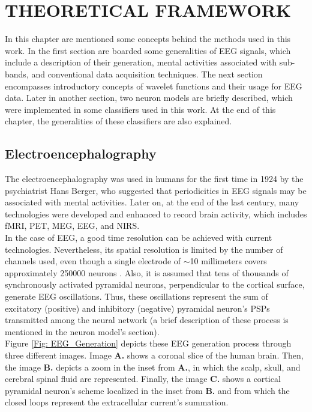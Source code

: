 \chapter[THEORETICAL FRAMEWORK]{\huge THEORETICAL FRAMEWORK}
In this chapter are mentioned some concepts behind the methods used in this work. In the first section are boarded some generalities of EEG signals, which include a description of their generation, mental activities associated with sub-bands, and conventional data acquisition techniques. The next section encompasses introductory concepts of wavelet functions and their usage for EEG data. Later in another section, two neuron models are briefly described, which were implemented in some classifiers used in this work. At the end of this chapter, the generalities of these classifiers are also explained.\\

\section{Electroencephalography}
The electroencephalography was used in humans for the first time in 1924 by the psychiatrist Hans Berger, who suggested that periodicities in EEG signals may be associated with mental activities. Later on, at the end of the last century, many technologies were developed and enhanced to record brain activity, which includes fMRI, PET, MEG, EEG, and NIRS.\\

In the case of EEG, a good time resolution can be achieved with current technologies. Nevertheless, its spatial resolution is limited by the number of channels used, even though a single electrode of $\sim$10 millimeters covers approximately 250000 neurons \cite{pizzagalli2007electroencephalography}. Also, it is assumed that tens of thousands of synchronously activated pyramidal neurons, perpendicular to the cortical surface, generate EEG oscillations. Thus, these oscillations represent the sum of excitatory (positive) and inhibitory (negative) pyramidal neuron's PSPs transmitted among the neural network (a brief description of these process is mentioned in the neuron model's section).\\

Figure \ref{Fig: EEG_Generation} depicts these EEG generation process through three different images. Image \textbf{A.} shows a coronal slice of the human brain. Then, the image \textbf{B.} depicts a zoom in the inset from \textbf{A.}, in which the scalp, skull, and cerebral spinal fluid are represented. Finally, the image \textbf{C.} shows a cortical pyramidal neuron's scheme localized in the inset from \textbf{B.} and from which the closed loops represent the extracellular current's summation.\\

